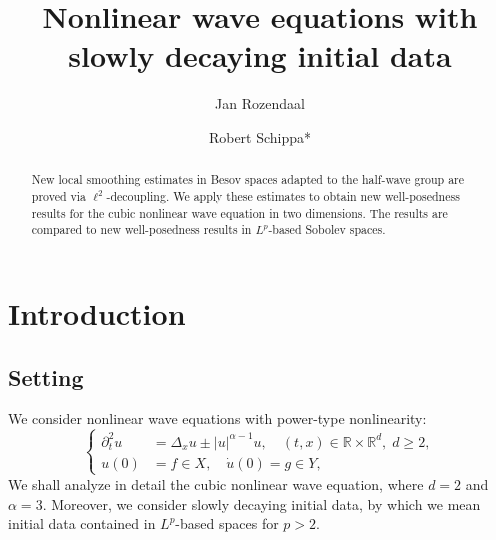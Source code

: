 \documentclass{amsart}
\title{Nonlinear wave equations with slowly decaying initial data}
\author{Jan Rozendaal}
\author[Robert Schippa]{Robert Schippa*}
\theoremstyle{definition}
\newcommand{\R}{\mathbb{R}}
\numberwithin{equation}{section}
\begin{document}
\begin{abstract}
New local smoothing estimates in Besov spaces adapted to the half-wave group are proved via $\ell^2$-decoupling. We apply these estimates to obtain new well-posedness results for the cubic nonlinear wave equation in two dimensions. The results are compared to new well-posedness results in $L^p$-based Sobolev spaces.
\end{abstract}


\maketitle




\section{Introduction}


\subsection*{Setting}


We consider nonlinear wave equations with power-type nonlinearity:
\begin{equation}
\label{eq:NLWIntro}
\begin{cases}
\partial_t^2 u &= \Delta_{x} u \pm |u|^{\alpha-1} u,\quad (t,x) \in \R \times \R^d, \; d \geq 2,\\
u(0)&= f \in X, \quad \dot{u}(0) = g \in Y,
\end{cases}
\end{equation}
We shall analyze in detail the cubic nonlinear wave equation, where $d=2$ and $\alpha =3$. Moreover, we consider slowly decaying initial data, by which we mean initial data contained in $L^{p}$-based spaces for $p>2$.
\end{document}

